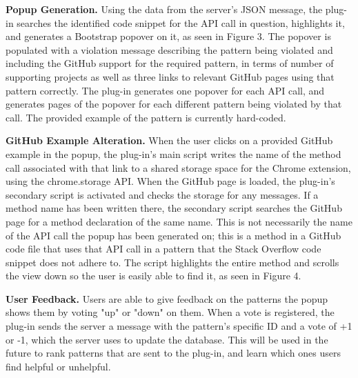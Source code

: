{\bf Popup Generation.} Using the data from the server's JSON message, the plug-in searches the identified code snippet for the API call in question, highlights it, and generates a Bootstrap popover on it, as seen in Figure 3. The popover is populated with a violation message describing the pattern being violated and including the GitHub support for the required pattern, in terms of number of supporting projects as well as three links to relevant GitHub pages using that pattern correctly. The plug-in generates one popover for each API call, and generates pages of the popover for each different pattern being violated by that call. The provided example of the pattern is currently hard-coded.

{\bf GitHub Example Alteration.} When the user clicks on a provided GitHub example in the popup, the plug-in's main script writes the name of the method call associated with that link to a shared storage space for the Chrome extension, using the chrome.storage API. When the GitHub page is loaded, the plug-in's secondary script is activated and checks the storage for any messages. If a method name has been written there, the secondary script searches the GitHub page for a method declaration of the same name. This is not necessarily the name of the API call the popup has been generated on; this is a method in a GitHub code file that uses that API call in a pattern that the Stack Overflow code snippet does not adhere to. The script highlights the entire method and scrolls the view down so the user is easily able to find it, as seen in Figure 4.

{\bf User Feedback.} Users are able to give feedback on the patterns the popup shows them by voting "up" or "down" on them. When a vote is registered, the plug-in sends the server a message with the pattern's specific ID and a vote of +1 or -1, which the server uses to update the database. This will be used in the future to rank patterns that are sent to the plug-in, and learn which ones users find helpful or unhelpful.